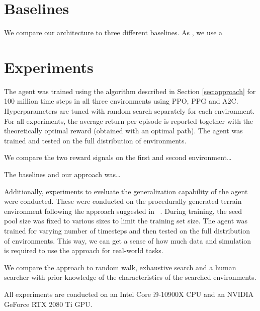 



\section{Baselines}
\label{sec:baseline}

We compare our architecture to three different baselines.
As \cite{mirowski_navigate_2017}, we use a 


\section{Experiments}
\label{sec:experiments}

The agent was trained using the algorithm described in Section \ref{sec:approach} for 100 million time steps in all three environments using PPO, PPG and A2C.
Hyperparameters are tuned with random search separately for each environment.
For all experiments, the average return per episode is reported together with the theoretically optimal reward (obtained with an optimal path).
The agent was trained and tested on the full distribution of environments.

We compare the two reward signals on the first and second environment\dots

The baselines and our approach was\dots

Additionally, experiments to eveluate the generalization capability of the agent were conducted.
These were conducted on the procedurally generated terrain environment following the approach suggested in ~\cite{procgen}.
During training, the seed pool size was fixed to various sizes to limit the training set size.
The agent was trained for varying number of timesteps and then tested on the full distribution of environments.
This way, we can get a sense of how much data and simulation is required to use the approach for real-world tasks.

We compare the approach to random walk, exhaustive search and a human searcher with prior knowledge of the characteristics of the searched environments.

All experiments are conducted on an Intel Core i9-10900X CPU and an NVIDIA GeForce RTX 2080 Ti GPU.


